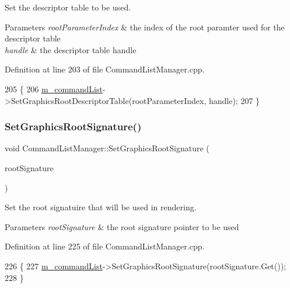 Set the descriptor table to be used. 


\begin{DoxyParams}{Parameters}
{\em root\+Parameter\+Index} & the index of the root paramter used for the descriptor table \\
\hline
{\em handle} & the descriptor table handle \\
\hline
\end{DoxyParams}


Definition at line 203 of file Command\+List\+Manager.\+cpp.


\begin{DoxyCode}
205 \{
206     \mbox{\hyperlink{class_command_list_manager_a1366f0acddca408167ffcab59be71ddb}{m\_commandList}}->SetGraphicsRootDescriptorTable(rootParameterIndex, handle);
207 \}
\end{DoxyCode}
\mbox{\label{class_command_list_manager_abfaf0356636617fc6007ff64b9c45fe1}} 
\subsubsection{\texorpdfstring{Set\+Graphics\+Root\+Signature()}{SetGraphicsRootSignature()}}
{\footnotesize\ttfamily void Command\+List\+Manager\+::\+Set\+Graphics\+Root\+Signature (\begin{DoxyParamCaption}\item[{Microsoft\+::\+W\+R\+L\+::\+Com\+Ptr$<$ I\+D3\+D12\+Root\+Signature $>$}]{root\+Signature }\end{DoxyParamCaption})}



Set the root signatuire that will be used in rendering. 


\begin{DoxyParams}{Parameters}
{\em root\+Signature} & the root signature pointer to be used \\
\hline
\end{DoxyParams}


Definition at line 225 of file Command\+List\+Manager.\+cpp.


\begin{DoxyCode}
226 \{
227     \mbox{\hyperlink{class_command_list_manager_a1366f0acddca408167ffcab59be71ddb}{m\_commandList}}->SetGraphicsRootSignature(rootSignature.Get());
228 \}
\end{DoxyCode}
\mbox{\label{class_command_list_manager_a1d31737c9ca7090659a9311df3b921f8}} 
